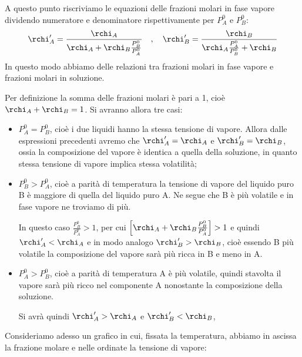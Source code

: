 A questo punto riscriviamo le equazioni delle frazioni molari in fase vapore dividendo numeratore e denominatore rispettivamente per $P_A^0$ e $P_B^0$:
$$\rchi'_A=\frac{\rchi_A}{\rchi_A + \rchi_B\frac{P^0_B}{P^0_A}}
\quad,\quad
\rchi'_B=\frac{\rchi_B}{\rchi_A\frac{P^0_A}{P^0_B} + \rchi_B}$$
In questo modo abbiamo delle relazioni tra frazioni molari in fase vapore e frazioni molari in soluzione.

Per definizione la somma delle frazioni molari è pari a 1, cioè $\rchi_A + \rchi_B =1$. Si avranno allora tre casi:
\begin{itemize}
    \item $P_A^0=P_B^0$, cioè i due liquidi hanno la stessa tensione di vapore. Allora dalle espressioni precedenti avremo che $\rchi_A'=\rchi_A$ e $\rchi_B'=\rchi_B$, ossia la composizione del vapore è identica a quella della soluzione, in quanto stessa tensione di vapore implica stessa volatilità;
    \item $P_B^0>P_A^0$, cioè a parità di temperatura la tensione di vapore del liquido puro B è maggiore di quella del liquido puro A. Ne segue che B è più volatile e in fase vapore ne troviamo di più.
    
    In questo caso $\frac{P_B^0}{P_A^0}>1$, per cui $\Big[\rchi_A + \rchi_B\frac{P_B^0}{P_A^0}\Big]>1$ e quindi $\rchi_A' < \rchi_A$ e in modo analogo $\rchi_B' > \rchi_B$, cioè essendo B più volatile la composizione del vapore sarà più ricca in B e meno in A.
    \item  $P_A^0>P_B^0$, cioè a parità di temperatura A è più volatile, quindi stavolta il vapore sarà più ricco nel componente A nonostante la composizione della soluzione.
    
    Si avrà quindi $\rchi_A' > \rchi_A$ e $\rchi_B' < \rchi_B$,
\end{itemize}

Consideriamo adesso un grafico in cui, fissata la temperatura, abbiamo in ascissa la frazione molare e nelle ordinate la tensione di vapore:

